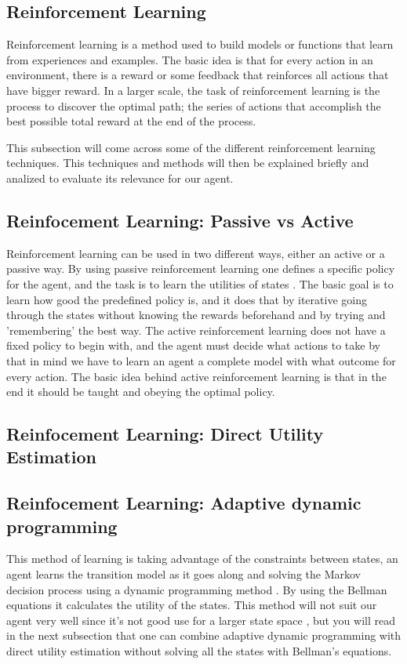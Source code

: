 \subsection*{Reinforcement Learning}

Reinforcement learning is a method used to build models or functions that learn from experiences and examples. The basic idea is that for every action in an environment, there is a reward or some feedback that reinforces all actions that have bigger reward. In a larger scale, the task of reinforcement learning is the process to discover the optimal path; the series of actions that accomplish the best possible total reward at the end of the process. 

This subsection will come across some of the different reinforcement learning techniques. This techniques and methods will then be explained briefly and analized to evaluate its relevance for our agent. 

\subsection*{Reinfocement Learning: Passive vs Active }

Reinforcement learning can be used in two different ways, either an active or a passive way. By using passive reinforcement learning one defines a specific policy for the agent, and the task is to learn the utilities of states \cite{rl}. The basic goal is to learn how good the predefined policy is, and it does that by iterative going through the states without knowing the rewards beforehand and by trying and 'remembering' the best way. The active reinforcement learning does not have a fixed policy to begin with, and the agent must decide what actions to take \cite[p771]{rl} by that in mind we have to learn an agent a complete model with what outcome for every action. The basic idea behind active reinforcement learning is that in the end it should be taught and obeying the optimal policy.
			
\subsection*{Reinfocement Learning: Direct Utility Estimation}


\subsection*{Reinfocement Learning: Adaptive dynamic programming}\label{ADP}
This method of learning is taking advantage of the constraints between states, an agent learns the transition model as it goes along and solving the Markov decision process \cite{mdp} using a dynamic programming method \cite{dp}. By using the Bellman equations it calculates the utility of the states. This method will not suit our agent very well since it's not good use for a larger state space \cite[p. 767]{rl}, but you will read in the next subsection that one can combine adaptive dynamic programming with direct utility estimation without solving all the states with Bellman's equations. 

